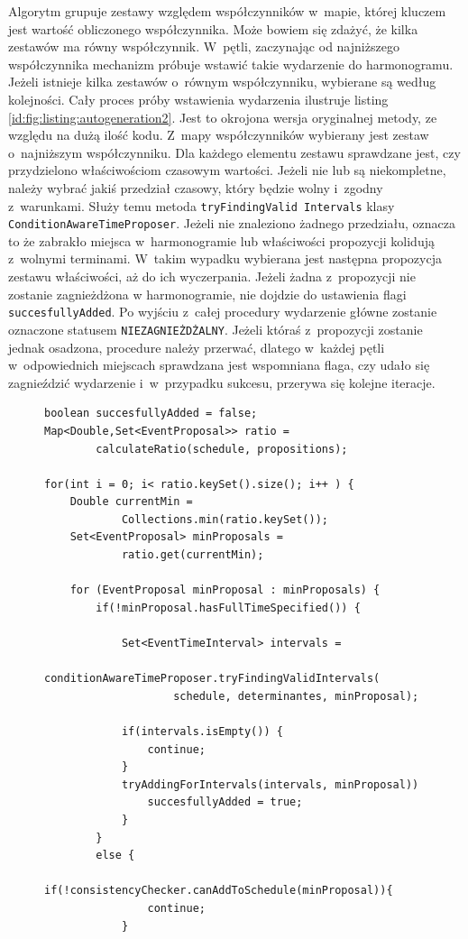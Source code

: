 \documentclass[a4paper]{book}
\begin{document}
{Algorytm grupuje zestawy względem współczynników w~mapie, której kluczem jest wartość obliczonego współczynnika. Może bowiem się zdażyć, że kilka zestawów ma równy współczynnik. W~pętli, zaczynając od najniższego współczynnika mechanizm próbuje wstawić takie wydarzenie do harmonogramu. Jeżeli istnieje kilka zestawów o~równym współczynniku, wybierane są według kolejności. Cały proces próby wstawienia wydarzenia ilustruje listing \ref{id:fig:listing:autogeneration2}. Jest to okrojona wersja oryginalnej metody, ze względu na dużą ilość kodu. Z~mapy współczynników wybierany jest zestaw o~najniższym współczynniku. Dla każdego elementu zestawu sprawdzane jest, czy przydzielono właściwościom czasowym wartości. Jeżeli nie lub są niekompletne, należy wybrać jakiś przedział czasowy, który będzie wolny i~zgodny z~warunkami. Służy temu metoda \lstinline|tryFindingValid Intervals| klasy \lstinline|ConditionAwareTimeProposer|. Jeżeli nie znaleziono żadnego przedziału, oznacza to że zabrakło miejsca w~harmonogramie lub właściwości propozycji kolidują z~wolnymi terminami. W~takim wypadku wybierana jest następna propozycja zestawu właściwości, aż do ich wyczerpania. Jeżeli żadna z~propozycji nie zostanie zagnieżdżona w harmonogramie, nie dojdzie do ustawienia flagi \lstinline|succesfullyAdded|. Po wyjściu z~całej procedury wydarzenie główne zostanie oznaczone statusem \lstinline|NIEZAGNIEŻDŻALNY|. Jeżeli któraś z~propozycji zostanie jednak osadzona, procedure należy przerwać, dlatego w~każdej pętli w~odpowiednich miejscach sprawdzana jest wspomniana flaga, czy udało się zagnieździć wydarzenie i~w~przypadku sukcesu, przerywa się kolejne iteracje.
\begin{figure}
\begin{lstlisting}
boolean succesfullyAdded = false;
Map<Double,Set<EventProposal>> ratio =
		calculateRatio(schedule, propositions);
		
for(int i = 0; i< ratio.keySet().size(); i++ ) {
	Double currentMin = 
			Collections.min(ratio.keySet());
	Set<EventProposal> minProposals = 
			ratio.get(currentMin);
			
	for (EventProposal minProposal : minProposals) {
		if(!minProposal.hasFullTimeSpecified()) {
		
			Set<EventTimeInterval> intervals = 
				conditionAwareTimeProposer.tryFindingValidIntervals(
					schedule, determinantes, minProposal);
			
			if(intervals.isEmpty()) {
				continue;
			}
			tryAddingForIntervals(intervals, minProposal)) 
				succesfullyAdded = true;
			}
		}
		else {
			if(!consistencyChecker.canAddToSchedule(minProposal)){
				continue;
			}
			

\end{lstlisting}
\end{figure}}
\end{document}

